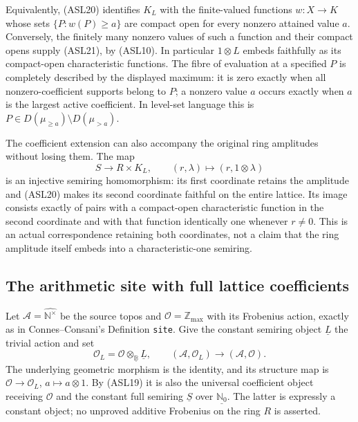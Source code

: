 Equivalently, (ASL20) identifies $K_L$ with the finite-valued
functions $w:X\to K$ whose sets $\{P:w(P)\ge a\}$ are compact open
for every nonzero attained value $a$. Conversely, the finitely many
nonzero values of such a function and their compact opens supply
(ASL21), by (ASL10). In particular $1\otimes L$ embeds faithfully
as its compact-open characteristic functions. The fibre of evaluation
at a specified $P$ is completely described by the displayed maximum:
it is zero exactly when all nonzero-coefficient supports belong to
$P$; a nonzero value $a$ occurs exactly when $a$ is the largest active
coefficient. In level-set language this is
$P\in D(\mu_{\ge a})\setminus D(\mu_{>a})$.

The coefficient extension can also accompany the original ring
amplitudes without losing them. The map
\begin{equation}\tag{ASL22}
 S\longrightarrow R\times K_L,\qquad
 (r,\lambda)\longmapsto(r,1\otimes\lambda)
\end{equation}
is an injective semiring homomorphism: its first coordinate retains
the amplitude and (ASL20) makes its second coordinate faithful on
the entire lattice. Its image consists exactly of pairs with a
compact-open characteristic function in the second coordinate and
with that function identically one whenever $r\ne0$. This is an
actual correspondence retaining both coordinates, not a claim that
the ring amplitude itself embeds into a characteristic-one semiring.

\subsection{The arithmetic site with full lattice coefficients}

Let $\mathscr A=\widehat{\mathbb N^\times}$ be the source topos and
$\mathcal O=\mathbb Z_{\max}$ with its Frobenius action, exactly as
in Connes--Consani's Definition \texttt{site}. Give the constant
semiring object $\underline L$ the trivial action and set
\begin{equation}\tag{ASL23}
 \mathcal O_L=\mathcal O\otimes_{\underline{\mathbb B}}\underline L,
 \qquad
 (\mathscr A,\mathcal O_L)\longrightarrow(\mathscr A,\mathcal O).
\end{equation}
The underlying geometric morphism is the identity, and its structure
map is $\mathcal O\to\mathcal O_L$, $a\mapsto a\otimes1$.
By (ASL19) it is also the universal coefficient object receiving
$\mathcal O$ and the constant full semiring $\underline S$ over
$\underline{\mathbb N_0}$. The latter is expressly a constant object;
no unproved additive Frobenius on the ring $R$ is asserted.

